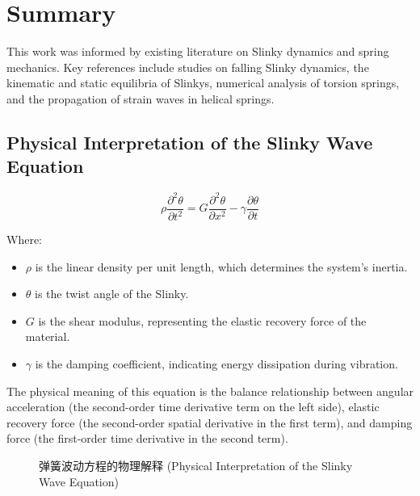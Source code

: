 \documentclass{mcmthesis}  %
\begin{document}
\section{Summary}  %

This work was informed by existing literature on Slinky dynamics and spring mechanics. Key references include studies on falling Slinky dynamics\cite{falling-slinky}, the kinematic and static equilibria of Slinkys\cite{kinematics-slinky}, numerical analysis of torsion springs\cite{torsion-springs}, and the propagation of strain waves in helical springs\cite{strain-waves-numerical, strain-waves-cylindrical}.

\printbibliography  %


\begin{appendices}  %

\section{Physical Interpretation of the Slinky Wave Equation}  %

\begin{equation}
\rho\frac{\partial^2 \theta}{\partial t^2} = G\frac{\partial^2 \theta}{\partial x^2} - \gamma \frac{\partial \theta}{\partial t}
\end{equation}

Where:
\begin{itemize}
    \item $\rho$ is the linear density per unit length, which determines the system's inertia.
    \item $\theta$ is the twist angle of the Slinky.
    \item $G$ is the shear modulus, representing the elastic recovery force of the material.
    \item $\gamma$ is the damping coefficient, indicating energy dissipation during vibration.
\end{itemize}

The physical meaning of this equation is the balance relationship between angular acceleration (the second-order time derivative term on the left side), elastic recovery force (the second-order spatial derivative in the first term), and damping force (the first-order time derivative in the second term).

\begin{figure}[h!]
    \centering
    \caption{弹簧波动方程的物理解释 (Physical Interpretation of the Slinky Wave Equation)}
    \label{fig:wave_equation_interpretation}
\end{figure}


\end{appendices}
\end{document}
